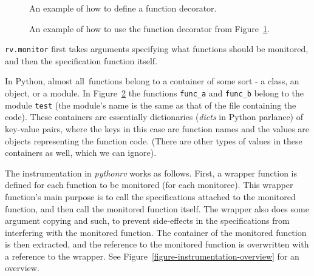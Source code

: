 \documentclass[a4paper,11pt]{kth-mag}
\begin{document}
\begin{figure}[h!]
	\begin{center}
	\begin{minipage}{0.7\textwidth}
	
	\end{minipage}
	\end{center}

	\caption{An example of how to define a function decorator.}
	\label{figure-function-decorator}
\end{figure}

\begin{figure}[h!]
	\begin{center}
	\begin{minipage}{0.7\textwidth}
	
	\end{minipage}
	\end{center}

	\caption{An example of how to use the function decorator from
	Figure~\ref{figure-function-decorator}.}
	\label{figure-function-decorator-usages}
\end{figure}

\texttt{rv.monitor} first takes arguments specifying what functions should be
monitored, and then the specification function itself.

In Python, almost all\footnotemark\ functions belong to a container of some
sort - a class, an object, or a module. In
Figure~\ref{figure-function-decorator-usages} the functions \texttt{func\_a}
and \texttt{func\_b} belong to the module \texttt{test} (the module's name is
the same as that of the file containing the code). These containers are
essentially dictionaries (\textit{dicts} in Python parlance) of key-value
pairs, where the keys in this case are function names and the values are
objects representing the function code. (There are other types of values in
these containers as well, which we can ignore).


The instrumentation in \textit{pythonrv} works as follows. First, a wrapper
function is defined for each function to be monitored (for each monitoree).
This wrapper function's main purpose is to call the specifications attached to
the monitored function, and then call the monitored function itself. The
wrapper also does some argument copying and such, to prevent side-effects in
the specifications from interfering with the monitored function. The container
of the monitored function is then extracted, and the reference to the monitored
function is overwritten with a reference to the wrapper. See
Figure~\ref{figure-instrumentation-overview} for an overview.
\end{document}
